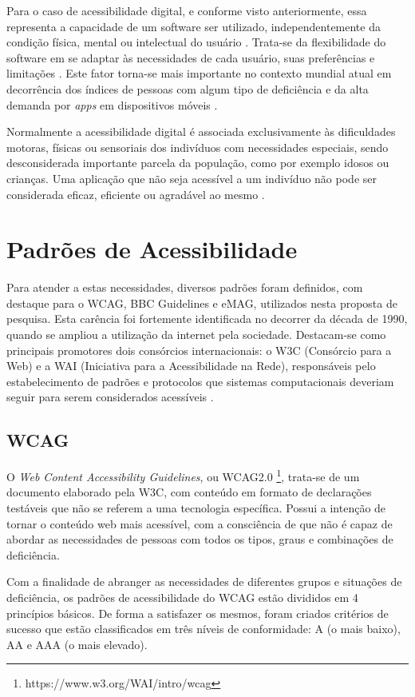 \documentclass[
	12pt,				%
	oneside,			%
	a4paper,			%
	english,			%
	brazil				%
	]{abntex2ppgsi}
\begin{document}
Para o caso de acessibilidade digital, e conforme visto anteriormente, essa representa a capacidade de um software ser utilizado, independentemente da condição física, mental ou intelectual do usuário \cite{w3cwai}. Trata-se da flexibilidade do software em se adaptar às necessidades de cada usuário, suas preferências e limitações \cite{camilamaster}. Este fator torna-se mais importante no contexto mundial atual em decorrência dos índices de pessoas com algum tipo de deficiência e da alta demanda por \textit{apps} em dispositivos móveis \cite{storeanalysis}.

Normalmente a acessibilidade digital é associada exclusivamente às dificuldades motoras, físicas ou sensoriais dos indivíduos com necessidades especiais, sendo desconsiderada importante parcela da população, como por exemplo idosos ou crianças. Uma aplicação que não seja acessível a um indivíduo não pode ser considerada eficaz, eficiente ou agradável ao mesmo \cite{santarosa}.

\section{Padrões de Acessibilidade}
Para atender a estas necessidades, diversos padrões foram definidos, com destaque para o WCAG, BBC Guidelines e eMAG, utilizados nesta proposta de pesquisa. Esta carência foi fortemente identificada no decorrer da década de 1990, quando se ampliou a utilização da internet pela sociedade. Destacam-se como principais promotores dois consórcios internacionais: o W3C (Consórcio para a Web) e a WAI (Iniciativa para a Acessibilidade na Rede), responsáveis pelo estabelecimento de padrões e protocolos que sistemas computacionais deveriam seguir para serem considerados acessíveis \cite{passerino}.

\subsection{WCAG}
O \textit{Web Content Accessibility Guidelines}, ou WCAG2.0 \footnote{https://www.w3.org/WAI/intro/wcag}, trata-se de um documento elaborado pela W3C, com conteúdo em formato de declarações testáveis que não se referem a uma tecnologia específica. Possui a intenção de tornar o conteúdo web mais acessível, com a consciência de que não é capaz de abordar as necessidades de pessoas com todos os tipos, graus e combinações de deficiência.

Com a finalidade de abranger as necessidades de diferentes grupos e situações de deficiência, os padrões de acessibilidade do WCAG estão divididos em 4 princípios básicos. De forma a satisfazer os mesmos, foram criados critérios de sucesso que estão classificados em três níveis de conformidade: A (o mais baixo), AA e AAA (o mais elevado).
\end{document}
